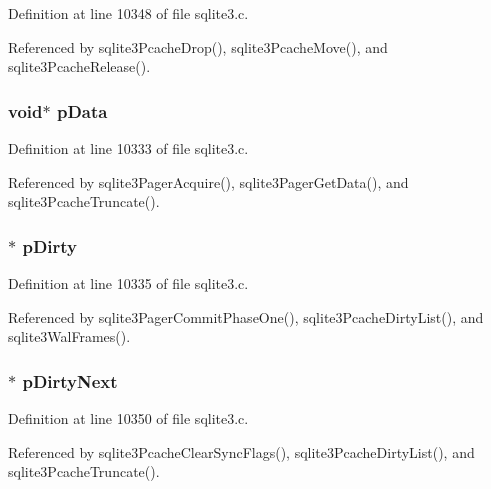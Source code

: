 Definition at line 10348 of file sqlite3.\+c.



Referenced by sqlite3\+Pcache\+Drop(), sqlite3\+Pcache\+Move(), and sqlite3\+Pcache\+Release().

\hypertarget{struct_pg_hdr_aa92f08987c51e4eb7b92e84944ca2af3}{}
\subsubsection[{p\+Data}]{\setlength{\rightskip}{0pt plus 5cm}void$\ast$ p\+Data}\label{struct_pg_hdr_aa92f08987c51e4eb7b92e84944ca2af3}


Definition at line 10333 of file sqlite3.\+c.



Referenced by sqlite3\+Pager\+Acquire(), sqlite3\+Pager\+Get\+Data(), and sqlite3\+Pcache\+Truncate().

\hypertarget{struct_pg_hdr_a2997dc2dc0dd03fdd59937ca5a4eef8a}{}
\subsubsection[{p\+Dirty}]{$\ast$ p\+Dirty}\label{struct_pg_hdr_a2997dc2dc0dd03fdd59937ca5a4eef8a}


Definition at line 10335 of file sqlite3.\+c.



Referenced by sqlite3\+Pager\+Commit\+Phase\+One(), sqlite3\+Pcache\+Dirty\+List(), and sqlite3\+Wal\+Frames().

\hypertarget{struct_pg_hdr_a9a8b52f1709a2099793247a8ce648e35}{}
\subsubsection[{p\+Dirty\+Next}]{$\ast$ p\+Dirty\+Next}\label{struct_pg_hdr_a9a8b52f1709a2099793247a8ce648e35}


Definition at line 10350 of file sqlite3.\+c.



Referenced by sqlite3\+Pcache\+Clear\+Sync\+Flags(), sqlite3\+Pcache\+Dirty\+List(), and sqlite3\+Pcache\+Truncate().

